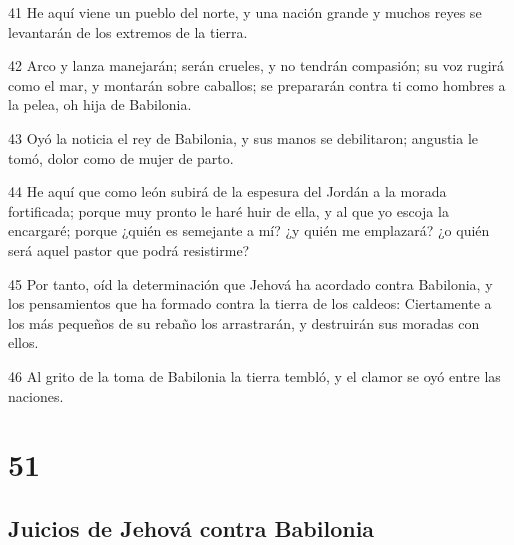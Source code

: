 \par 41 He aquí viene un pueblo del norte, y una nación grande y muchos reyes se levantarán de los extremos de la tierra.
\par 42 Arco y lanza manejarán; serán crueles, y no tendrán compasión; su voz rugirá como el mar, y montarán sobre caballos; se prepararán contra ti como hombres a la pelea, oh hija de Babilonia.
\par 43 Oyó la noticia el rey de Babilonia, y sus manos se debilitaron; angustia le tomó, dolor como de mujer de parto.
\par 44 He aquí que como león subirá de la espesura del Jordán a la morada fortificada; porque muy pronto le haré huir de ella, y al que yo escoja la encargaré; porque ¿quién es semejante a mí? ¿y quién me emplazará? ¿o quién será aquel pastor que podrá resistirme?
\par 45 Por tanto, oíd la determinación que Jehová ha acordado contra Babilonia, y los pensamientos que ha formado contra la tierra de los caldeos: Ciertamente a los más pequeños de su rebaño los arrastrarán, y destruirán sus moradas con ellos.
\par 46 Al grito de la toma de Babilonia la tierra tembló, y el clamor se oyó entre las naciones.

\chapter{51}

\section*{Juicios de Jehová contra Babilonia}

